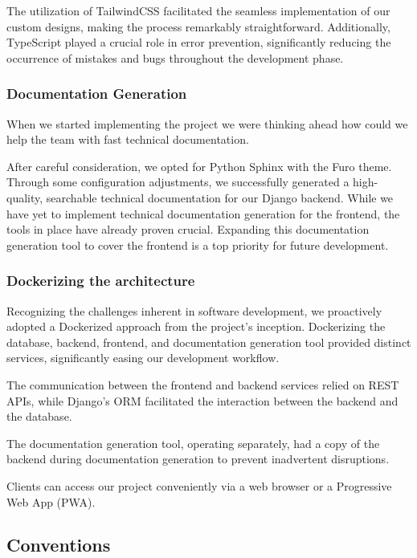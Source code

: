 \documentclass[12pt,a4paper]{article}
\begin{document}
\begin{spacing}{1.5}
    The utilization of TailwindCSS facilitated the seamless implementation of our
    custom designs, making the process remarkably straightforward. Additionally,
    TypeScript played a crucial role in error prevention, significantly reducing
    the occurrence of mistakes and bugs throughout the development phase.

    \subsubsection{Documentation Generation}
    When we started implementing the project we were thinking ahead how could we
    help the team with fast technical documentation.

    After careful consideration, we opted for Python Sphinx with the Furo theme.
    Through some configuration adjustments, we successfully generated a
    high-quality, searchable technical documentation for our Django backend. While
    we have yet to implement technical documentation generation for the frontend,
    the tools in place have already proven crucial. Expanding this documentation
    generation tool to cover the frontend is a top priority for future development.

    \subsubsection{Dockerizing the architecture}
    Recognizing the challenges inherent in software development, we proactively
    adopted a Dockerized approach from the project's inception. Dockerizing the
    database, backend, frontend, and documentation generation tool provided
    distinct services, significantly easing our development workflow.

    The communication between the frontend and backend services relied on REST
    APIs, while Django's ORM facilitated the interaction between the backend and
    the database.

    The documentation generation tool, operating separately, had a copy of the
    backend during documentation generation to prevent inadvertent disruptions.

    Clients can access our project conveniently via a web browser or a Progressive
    Web App (PWA).

    \subsection{Conventions}


\end{spacing}
\end{document}
